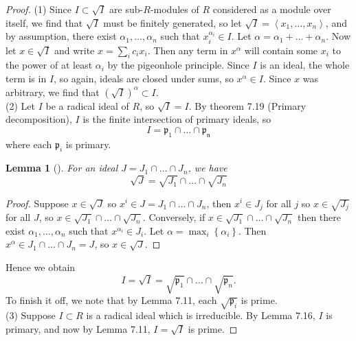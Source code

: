 \documentclass[reqno]{amsart}
\newtheorem{lemma}[theorem]{Lemma}
\theoremstyle{definition}
\theoremstyle{remark}
\begin{document}
    \begin{proof}
        (1) Since $I \subset \sqrt{I} $ are
        sub-$R$-modules of $R$ considered as a module
        over itself, we find that
        $\sqrt{I} $ must be finitely generated, so let
        $\sqrt{I}  = \left< x_1, \ldots, x_n \right>$, and
        by assumption,
        there exist $\alpha_1, \ldots, \alpha_n$ such that
        $x_i^{\alpha_i} \in I$.
        Let $\alpha = \alpha_1 + \ldots
        + \alpha_n$.
        Now let
        $x \in \sqrt{I} $ and write
        $x = \sum_{i} c_i x_i$. Then
        any term in
        $x^{\alpha}$ will contain some
        $x_i$ to the power of at
        least $\alpha_i$ by
        the pigeonhole principle. Since
        $I$ is an ideal, the whole term is in $I$, so
        again, ideals are closed under sums, so
         $x^{\alpha} \in I$.
         Since $x$ was arbitrary, we find
         that
         $\left( \sqrt{I}  \right)^{\alpha}
         \subset I$.\\
         \linebreak
         (2) Let
         $I$ be a radical ideal of $R$, so
         $\sqrt{I}  = I$.
         By theorem 7.19 (Primary decomposition),
         $I$ is the finite intersection
         of primary ideals, so
         \[
         I = \mathfrak{p}_1 \cap \ldots
         \cap \mathfrak{p_n}
         \] 
         where each $\mathfrak{p}_i$ is primary.

         \begin{lemma}[]
             For an ideal $J =
             J_1 \cap \ldots \cap J_n$, we have
             \[
             \sqrt{J}  = \sqrt{J_1}  \cap
             \ldots \cap \sqrt{J_n} 
             \] 
         \end{lemma}
         \begin{proof}
             Suppose
             $x \in \sqrt{J} $ so
             $x^{i} \in J = 
             J_1 \cap \ldots \cap J_n$, then
             $x^{i} \in J_j$ for all $j$ so
             $x \in \sqrt{J_j} $ for all $J$, so
             $x \in \sqrt{J_1}  \cap \ldots
             \cap \sqrt{J_n} $.
             Conversely, if
             $x \in \sqrt{J_1} \cap \ldots
             \cap \sqrt{J_n} $ then
             there exist  $\alpha_1, \ldots, \alpha_n$ 
             such that
             $x^{\alpha_i} \in J_i$.
             Let $\alpha = \max_{i} \left\{ \alpha_i \right\} $.
             Then
             $x^{\alpha} \in 
             J_1 \cap \ldots \cap J_n = J$, so
             $x \in \sqrt{J} $.
         \end{proof}
         Hence we obtain
         \[
         I = \sqrt{I}  =
         \sqrt{\mathfrak{p}_1}  \cap
         \ldots \cap
         \sqrt{\mathfrak{p}_n} .
         \] 
         To finish it off, we note that
         by Lemma 7.11,
         each $\sqrt{\mathfrak{p}_i} $ is prime.\\
         \linebreak
         (3) Suppose
         $I \subset R$ is a radical ideal which is
         irreducible.
         By Lemma 7.16, $I$ is primary, and now by
         Lemma 7.11, 
         $I = \sqrt{I} $ is prime.
    \end{proof}
\end{document}
